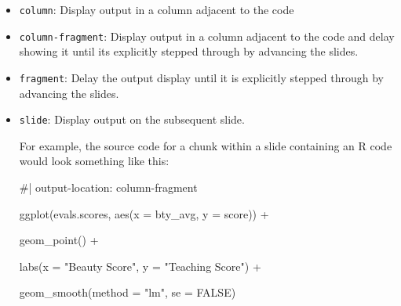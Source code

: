\documentclass[
  letterpaper,
  DIV=11,
  numbers=noendperiod]{scrartcl}
\newenvironment{Shaded}{\begin{snugshade}}{\end{snugshade}}
\newcommand{\AttributeTok}[1]{\textcolor[rgb]{0.40,0.45,0.13}{#1}}
\newcommand{\CommentTok}[1]{\textcolor[rgb]{0.37,0.37,0.37}{#1}}
\newcommand{\ConstantTok}[1]{\textcolor[rgb]{0.56,0.35,0.01}{#1}}
\newcommand{\FunctionTok}[1]{\textcolor[rgb]{0.28,0.35,0.67}{#1}}
\newcommand{\NormalTok}[1]{\textcolor[rgb]{0.00,0.23,0.31}{#1}}
\newcommand{\SpecialCharTok}[1]{\textcolor[rgb]{0.37,0.37,0.37}{#1}}
\newcommand{\StringTok}[1]{\textcolor[rgb]{0.13,0.47,0.30}{#1}}
\begin{document}
\begin{itemize}
\item
  \texttt{column}: Display output in a column adjacent to the code
\item
  \texttt{column-fragment}: Display output in a column adjacent to the
  code and delay showing it until its explicitly stepped through by
  advancing the slides.
\item
  \texttt{fragment}: Delay the output display until it is explicitly
  stepped through by advancing the slides.
\item
  \texttt{slide}: Display output on the subsequent slide.

  For example, the source code for a chunk within a slide containing an
  R code would look something like this:

\begin{Shaded}
\begin{Highlighting}[]

\CommentTok{\#| output{-}location: column{-}fragment}

\FunctionTok{ggplot}\NormalTok{(evals.scores, }\FunctionTok{aes}\NormalTok{(}\AttributeTok{x =}\NormalTok{ bty\_avg, }\AttributeTok{y =}\NormalTok{ score)) }\SpecialCharTok{+}

  \FunctionTok{geom\_point}\NormalTok{() }\SpecialCharTok{+}

  \FunctionTok{labs}\NormalTok{(}\AttributeTok{x =} \StringTok{"Beauty Score"}\NormalTok{, }\AttributeTok{y =} \StringTok{"Teaching Score"}\NormalTok{) }\SpecialCharTok{+}

  \FunctionTok{geom\_smooth}\NormalTok{(}\AttributeTok{method =} \StringTok{"lm"}\NormalTok{, }\AttributeTok{se =} \ConstantTok{FALSE}\NormalTok{)}
\end{Highlighting}
\end{Shaded}
\end{itemize}
\end{document}
